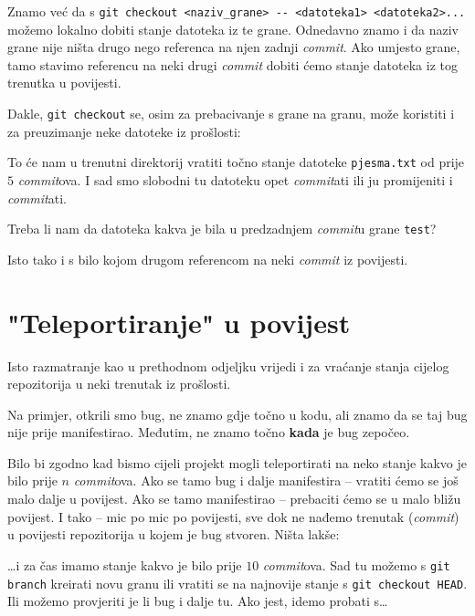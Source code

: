Znamo već da s \verb+git checkout <naziv_grane> -- <datoteka1> <datoteka2>...+ možemo lokalno dobiti stanje datoteka iz te grane.
Odnedavno znamo i da naziv grane nije ništa drugo nego referenca na njen zadnji \emph{commit}.
Ako umjesto grane, tamo stavimo referencu na neki drugi \emph{commit} dobiti ćemo stanje datoteka iz tog trenutka u povijesti.

Dakle, \verb+git checkout+ se, osim za prebacivanje s grane na granu, može koristiti i za preuzimanje neke datoteke iz prošlosti:


To će nam u trenutni direktorij vratiti točno stanje datoteke \verb+pjesma.txt+ od prije $5$ \emph{commit}ova.
I sad smo slobodni tu datoteku opet \emph{commit}ati ili ju promijeniti i \emph{commit}ati.

Treba li nam da datoteka kakva je bila u predzadnjem \emph{commit}u grane \verb+test+?


Isto tako i s bilo kojom drugom referencom na neki \emph{commit} iz povijesti.

\section*{"Teleportiranje" u povijest}

Isto razmatranje kao u prethodnom odjeljku vrijedi i za vraćanje stanja cijelog repozitorija u neki trenutak iz prošlosti.

Na primjer, otkrili smo bug, ne znamo gdje točno u kodu, ali znamo da se taj bug nije prije manifestirao. 
Međutim, ne znamo točno \textbf{kada} je bug zepočeo.

Bilo bi zgodno kad bismo cijeli projekt mogli teleportirati na neko stanje kakvo je bilo prije $n$ \emph{commit}ova.
Ako se tamo bug i dalje manifestira -- vratiti ćemo se još malo dalje u povijest.
Ako se tamo manifestirao -- prebaciti ćemo se u malo bližu povijest.
I tako -- mic po mic po povijesti, sve dok ne nađemo trenutak (\emph{commit}) u povijesti repozitorija u kojem je bug stvoren.
Ništa lakše:


\dots{}i za čas imamo stanje kakvo je bilo prije $10$ \emph{commit}ova. Sad tu možemo s \verb+git branch+ kreirati novu granu ili vratiti se na najnovije stanje s \verb+git checkout HEAD+. Ili možemo provjeriti je li bug i dalje tu. Ako jest, idemo probati s\dots

